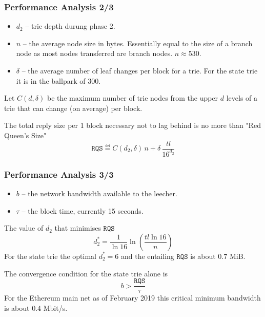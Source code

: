 \documentclass{beamer}
\begin{document}
\begin{frame}
  \frametitle{Performance Analysis 2/3}

  \begin{itemize}
    \item $d_2$ -- trie depth durung phase 2.
   
    \item $n$ -- the average node size in bytes.
  Essentially equal to the size of a branch node as most nodes transferred are branch nodes.
  $n \approx 530$.
  
  \item $\delta$ -- the average number of leaf changes per block for a trie.
  For the state trie it is in the ballpark of 300.

  \end{itemize}

  \bigskip
  
  Let $C(d, \delta)$ be the maximum number of trie nodes from the upper $d$ levels of a trie that can change (on average) per block.

  The total reply size per 1 block necessary not to lag behind is no more than
  "Red Queen's Size"
  \begin{equation}
    \texttt{RQS} \overset{\underset{\mathrm{def}}{}}{=}
    C(d_2, \delta) \, n + \delta \, \frac{tl}{16^{d_2}}
\end{equation}

\end{frame}

\begin{frame}
  \frametitle{Performance Analysis 3/3}

  \begin{itemize}
  \item $b$ -- the network bandwidth available to the leecher.
  
  \item $\tau$ -- the block time, currently 15 seconds.

  \end{itemize}

  \bigskip
  
  The value of $d_2$ that minimises $\texttt{RQS}$
  \begin{equation}
      d_2^* = \frac{1}{\ln 16} \ln \left( \frac{tl \ln16}{n} \right)
  \end{equation}
  For the state trie the optimal $d_2^* = 6$ and the entailing $\texttt{RQS}$ is about 0.7 MiB.
  
  The convergence condition for the state trie alone is
  \begin{equation}
      b > \frac{\texttt{RQS}}{\tau}
  \end{equation}
  For the Ethereum main net as of February 2019 this critical minimum bandwidth is about 0.4 Mbit/s.

\end{frame}
\end{document}
